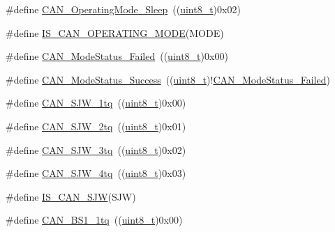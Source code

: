 \begin{DoxyCompactItemize}
\item 
\#define \hyperlink{group___c_a_n___operating___mode_ga173b85d2baaa6249d966b8073e3ad8ca}{C\+A\+N\+\_\+\+Operating\+Mode\+\_\+\+Sleep}~((\hyperlink{_p_e___types_8h_aba7bc1797add20fe3efdf37ced1182c5}{uint8\+\_\+t})0x02)
\item 
\#define \hyperlink{group___c_a_n___operating___mode_ga377f1598db9b0248ba83fa6e5a75db75}{I\+S\+\_\+\+C\+A\+N\+\_\+\+O\+P\+E\+R\+A\+T\+I\+N\+G\+\_\+\+M\+O\+DE}(M\+O\+DE)
\item 
\#define \hyperlink{group___c_a_n___mode___status_ga9882944537945325ef08e1986838ea45}{C\+A\+N\+\_\+\+Mode\+Status\+\_\+\+Failed}~((\hyperlink{_p_e___types_8h_aba7bc1797add20fe3efdf37ced1182c5}{uint8\+\_\+t})0x00)
\item 
\#define \hyperlink{group___c_a_n___mode___status_ga7ca0ea503eb3b3a7c0abdfad27cb6579}{C\+A\+N\+\_\+\+Mode\+Status\+\_\+\+Success}~((\hyperlink{_p_e___types_8h_aba7bc1797add20fe3efdf37ced1182c5}{uint8\+\_\+t})!\hyperlink{group___c_a_n___mode___status_ga9882944537945325ef08e1986838ea45}{C\+A\+N\+\_\+\+Mode\+Status\+\_\+\+Failed})
\item 
\#define \hyperlink{group___c_a_n__synchronisation__jump__width_ga4e03d22ae683b63cb4df238449ec967c}{C\+A\+N\+\_\+\+S\+J\+W\+\_\+1tq}~((\hyperlink{_p_e___types_8h_aba7bc1797add20fe3efdf37ced1182c5}{uint8\+\_\+t})0x00)
\item 
\#define \hyperlink{group___c_a_n__synchronisation__jump__width_gad39e7656c555cc00bc4d7c1bff39916f}{C\+A\+N\+\_\+\+S\+J\+W\+\_\+2tq}~((\hyperlink{_p_e___types_8h_aba7bc1797add20fe3efdf37ced1182c5}{uint8\+\_\+t})0x01)
\item 
\#define \hyperlink{group___c_a_n__synchronisation__jump__width_gab4de740e2184aac71c2c8cba22a8ecd2}{C\+A\+N\+\_\+\+S\+J\+W\+\_\+3tq}~((\hyperlink{_p_e___types_8h_aba7bc1797add20fe3efdf37ced1182c5}{uint8\+\_\+t})0x02)
\item 
\#define \hyperlink{group___c_a_n__synchronisation__jump__width_ga7f26a36d478c7ba1a1441b369d62f693}{C\+A\+N\+\_\+\+S\+J\+W\+\_\+4tq}~((\hyperlink{_p_e___types_8h_aba7bc1797add20fe3efdf37ced1182c5}{uint8\+\_\+t})0x03)
\item 
\#define \hyperlink{group___c_a_n__synchronisation__jump__width_ga4e4f344712d3bcac1975318d4ab9a383}{I\+S\+\_\+\+C\+A\+N\+\_\+\+S\+JW}(S\+JW)
\item 
\#define \hyperlink{group___c_a_n__time__quantum__in__bit__segment__1_ga76b8fb0815b7a3f398fffe72dda0bc04}{C\+A\+N\+\_\+\+B\+S1\+\_\+1tq}~((\hyperlink{_p_e___types_8h_aba7bc1797add20fe3efdf37ced1182c5}{uint8\+\_\+t})0x00)

\end{DoxyCompactItemize}
